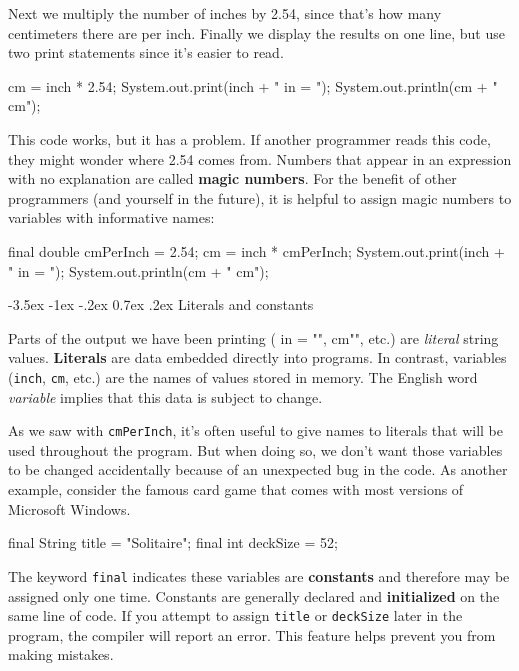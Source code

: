 \documentclass[12pt]{book}
\makeatletter
\theoremstyle{exercise}
\newcommand{\java}[1]{\verb"#1"}
\renewcommand{\section}{\@startsection {section}{1}{\z@}%
    {-3.5ex \@plus -1ex \@minus -.2ex}%
    {0.7ex \@plus.2ex}%
    {\normalfont\Large\bfseries}}
\newcommand{\java}[1]{\lstinline{#1}} %
\makeatother
\begin{document}
Next we multiply the number of inches by 2.54, since that's how many centimeters there are per inch.
Finally we display the results on one line, but use two print statements since it's easier to read.

\begin{code}
    cm = inch * 2.54;
    System.out.print(inch + " in = ");
    System.out.println(cm + " cm");
\end{code}


This code works, but it has a problem.
If another programmer reads this code, they might wonder where 2.54 comes from.
Numbers that appear in an expression with no explanation are called {\bf magic numbers}.
For the benefit of other programmers (and yourself in the future), it is helpful to assign magic numbers to variables with informative names:

\begin{code}
    final double cmPerInch = 2.54;
    cm = inch * cmPerInch;
    System.out.print(inch + " in = ");
    System.out.println(cm + " cm");
\end{code}

\section{Literals and constants}


Parts of the output we have been printing (\java{" in = "}, \java{" cm"}, etc.) are {\em literal} string values.
{\bf Literals} are data embedded directly into programs.
In contrast, variables (\java{inch}, \java{cm}, etc.) are the names of values stored in memory.
The English word {\em variable} implies that this data is subject to change.

As we saw with \java{cmPerInch}, it's often useful to give names to literals that will be used throughout the program.
But when doing so, we don't want those variables to be changed accidentally because of an unexpected bug in the code.
As another example, consider the famous card game that comes with most versions of Microsoft Windows.

\begin{code}
    final String title = "Solitaire";
    final int deckSize = 52;
\end{code}


The keyword \java{final} indicates these variables are {\bf constants} and therefore may be assigned only one time.
Constants are generally declared and {\bf initialized} on the same line of code.
If you attempt to assign \java{title} or \java{deckSize} later in the program, the compiler will report an error.
This feature helps prevent you from making mistakes.
\end{document}
